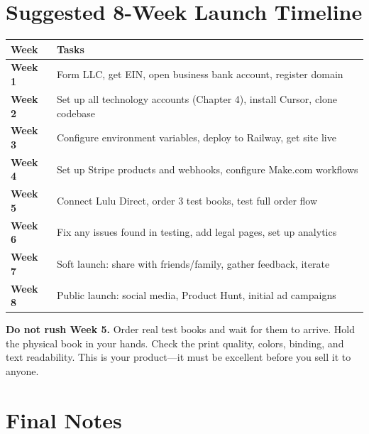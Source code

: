 \documentclass[12pt, letterpaper, oneside]{book}
\begin{document}
\chapter{Suggested 8-Week Launch Timeline}

\begin{table}[H]
\centering
\begin{tabularx}{\textwidth}{lX}
\toprule
\textbf{Week} & \textbf{Tasks} \\
\midrule
\textbf{Week 1} & Form LLC, get EIN, open business bank account, register domain \\
\textbf{Week 2} & Set up all technology accounts (Chapter 4), install Cursor, clone codebase \\
\textbf{Week 3} & Configure environment variables, deploy to Railway, get site live \\
\textbf{Week 4} & Set up Stripe products and webhooks, configure Make.com workflows \\
\textbf{Week 5} & Connect Lulu Direct, order 3 test books, test full order flow \\
\textbf{Week 6} & Fix any issues found in testing, add legal pages, set up analytics \\
\textbf{Week 7} & Soft launch: share with friends/family, gather feedback, iterate \\
\textbf{Week 8} & Public launch: social media, Product Hunt, initial ad campaigns \\
\bottomrule
\end{tabularx}
\end{table}

\begin{infobox}
\textbf{Do not rush Week 5.} Order real test books and wait for them to arrive. Hold the physical book in your hands. Check the print quality, colors, binding, and text readability. This is your product---it must be excellent before you sell it to anyone.
\end{infobox}

\chapter*{Final Notes}
\end{document}
